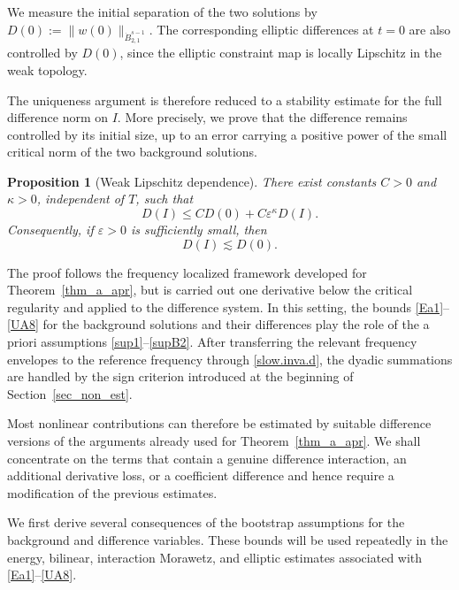 \documentclass[11pt,letterpaper,reqno]{amsart}
\numberwithin{equation}{section}
\newtheorem{proposition}[theorem]{Proposition}
\theoremstyle{definition}
\theoremstyle{remark}
\begin{document}
We measure the initial separation of the two solutions by
 \( D(0) := \|w(0)\|_{\dot B^{s-1}_{2,1}}. \) The corresponding elliptic differences at \(t=0\) are also controlled by \(D(0)\), since the elliptic constraint map is locally Lipschitz in the weak topology.

The uniqueness argument is therefore reduced to a stability estimate for the
full difference norm on \(I\). More precisely, we prove that the
difference remains controlled by its initial size, up to an error carrying a
positive power of the small critical norm of the two background solutions. 
\begin{proposition}[Weak Lipschitz dependence]
\label{prop1}
There exist constants \(C>0\) and \(\kappa>0\), independent of \(T\), such
that
\[
D(I)
\leq
C D(0)
+
C\varepsilon^\kappa D(I).
\]
Consequently, if \(\varepsilon>0\) is sufficiently small, then
\[
D(I)
\lesssim
D(0).
\]
\end{proposition}
The proof follows the frequency localized framework developed for
Theorem~\ref{thm_a_apr}, but is carried out one derivative below the critical
regularity and applied to the difference system. In this setting, the bounds
\eqref{Ea1}--\eqref{UA8} for the background solutions and their differences
play the role of the a priori assumptions \eqref{sup1}--\eqref{supB2}.
After transferring the relevant frequency envelopes to the reference
frequency through \eqref{slow.inva.d}, the dyadic summations are handled by
the sign criterion introduced at the beginning of
Section~\ref{sec_non_est}.


Most nonlinear contributions can therefore be estimated by suitable
difference versions of the arguments already used for
Theorem~\ref{thm_a_apr}. We shall concentrate on the terms that contain a
genuine difference interaction, an additional derivative loss, or a
coefficient difference and hence require a modification of the previous
estimates.

We first derive several consequences of the bootstrap assumptions for the
background and difference variables. These bounds will be used repeatedly in
the energy, bilinear, interaction Morawetz, and elliptic estimates associated
with \eqref{Ea1}--\eqref{UA8}.
\end{document}
